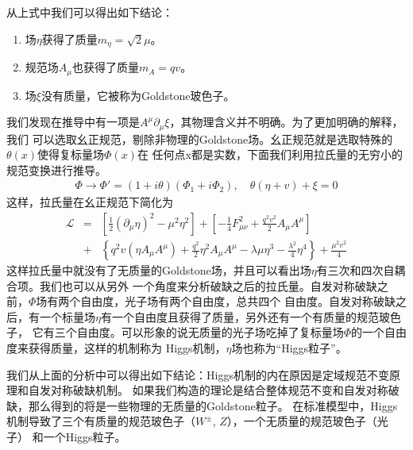 从上式中我们可以得出如下结论：
\begin{enumerate}
\item
场$\eta$获得了质量$m_{\eta} = \sqrt{2}\mu$。
\item
规范场$A_{\mu}$也获得了质量$m_A = qv$。
\item
场$\xi$没有质量，它被称为Goldstone玻色子。
\end{enumerate}
我们发现在推导中有一项是$A^{\mu}\partial_{\mu}\xi$，其物理含义并不明确。为了更加明确的解释，我们
可以选取幺正规范，剔除非物理的Goldstone场。幺正规范就是选取特殊的$\theta(x)$使得复标量场$\Phi(x)$在
任何点x都是实数，下面我们利用拉氏量的无穷小的规范变换进行推导。
\begin{eqnarray}
\Phi \to \Phi' = (1 + i\theta)(\Phi_1 + i\Phi_2), \quad \theta(\eta + v) + \xi = 0
\end{eqnarray}
这样，拉氏量在幺正规范下简化为
\begin{eqnarray}
\mathscr{L} &=& \left[\frac{1}{2}(\partial_{\mu}\eta)^2 - \mu^2 \eta^2\right] + 
\left[-\frac{1}{4}F^2_{\mu\nu} + \frac{q^2v^2}{2}A_{\mu}A^{\mu}\right]
\nonumber \\
&+& \left\{ q^2v(\eta A_{\mu}A^{\mu}) + \frac{q^2}{2}\eta^2 A_{\mu}A^{\mu} - \lambda\mu\eta^3 
- \frac{\lambda^2}{4} \eta^4  \right\} + \frac{\mu^2v^2}{4} 
\end{eqnarray}
这样拉氏量中就没有了无质量的Goldstone场，并且可以看出场$\eta$有三次和四次自耦合项。我们也可以从另外
一个角度来分析破缺之后的拉氏量。自发对称破缺之前，$\Phi$场有两个自由度，光子场有两个自由度，总共四个
自由度。自发对称破缺之后，有一个标量场$\eta$有一个自由度且获得了质量，另外还有一个有质量的规范玻色子，
它有三个自由度。可以形象的说无质量的光子场吃掉了复标量场$\Phi$的一个自由度来获得质量，这样的机制称为
Higgs机制，$\eta$场也称为“Higgs粒子”。

我们从上面的分析中可以得出如下结论：Higgs机制的内在原因是定域规范不变原理和自发对称破缺机制。
如果我们构造的理论是结合整体规范不变和自发对称破缺，那么得到的将是一些物理的无质量的Goldstone粒子。
在标准模型中，Higgs机制导致了三个有质量的规范玻色子（$W^{\pm}$, $Z$），一个无质量的规范玻色子（光子）
和一个Higgs粒子。

